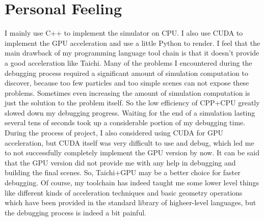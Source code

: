 \documentclass[acmlarge]{acmart}
\begin{document}

\section{Personal Feeling}

I mainly use C++ to implement the simulator on CPU. I also use CUDA to implement the GPU acceleration and use a little Python 
to render. I feel that the main drawback of my programming language tool chain is that it doesn't provide a good acceleration like Taichi.
Many of the problems I encountered during the debugging process required a significant amount of simulation computation to discover, because too 
few particles and too simple scenes can not expose these problems. Sometimes even increasing 
the amount of simulation computation is just the solution to the problem itself.
So the low efficiency of CPP+CPU greatly slowed down my debugging progress. 
Waiting for the end of a simulation lasting several tens of seconds took up a considerable portion of my debugging time.
During the process of project, I also considered using CUDA for GPU acceleration, 
but CUDA itself was very difficult to use and debug, which led me to not successfully completely implement the GPU version by now. 
It can be said that the GPU version did not provide me with any help in debugging and building the final scenes.
So, Taichi+GPU may be a better choice for faster debugging. 
Of course, my toolchain has indeed taught me some lower level things like different kinds of acceleration techniques and 
basic geometry operations which have been provided in the standard library of higheer-level languages, 
but the debugging process is indeed a bit painful.
\end{document}
